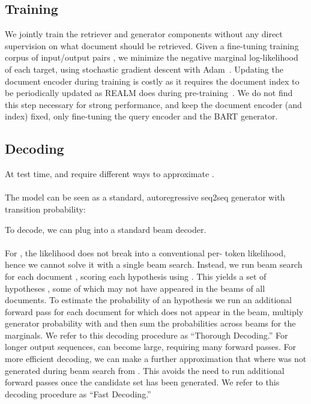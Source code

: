 \documentclass{article}
\begin{document}
\subsection{Training}
We jointly train the retriever and generator components without any direct supervision on what document should be retrieved.
Given a fine-tuning training corpus of input/output pairs , we minimize the negative marginal log-likelihood of each target,  using stochastic gradient descent with Adam~\cite{kingma_adam}.
Updating the document encoder  during training is costly as it requires the document index to be periodically updated as REALM does during pre-training~\cite{guu2020realm}. We do not find this step necessary for strong performance, and keep the document encoder (and index) fixed, only fine-tuning the query encoder  and the BART generator.

\subsection{Decoding}

At test time, \raganswer{} and \ragtoken{} require different ways to approximate .

\paragraph{\ragtoken{}} The \ragtoken{} model can be seen as a standard, autoregressive seq2seq generator with transition probability: 

To decode, we can plug  into a standard beam decoder.

\paragraph{\raganswer{}} 
For \raganswer{}, the likelihood  does not break into a conventional per- token likelihood, hence we cannot solve it with a single beam search. Instead, we run beam search for each  document , scoring each hypothesis using . This yields a set of hypotheses , some of which may not have appeared in the beams of all documents. To estimate the probability of an hypothesis  
we run an additional forward pass for each document \doc{} for which  does not appear in the beam, multiply generator probability with  and then sum the probabilities across beams for the marginals. We refer to this decoding procedure as ``Thorough Decoding.''
For longer output sequences,  can become large, requiring many forward passes. For more efficient decoding, we can make a further approximation that  where  was not generated during beam search from . This avoids the need to run additional forward passes once the candidate set  has been generated. We refer to this decoding procedure as ``Fast Decoding.''
 
\end{document}
